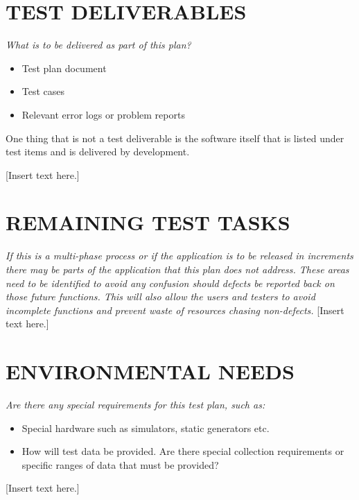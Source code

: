 \section[TEST DELIVERABLES]{\bfseries\color{black} TEST DELIVERABLES}
{\itshape\color{black}
What is to be delivered as part of this plan?

\begin{itemize}
\item Test plan document
\item Test cases
\item Relevant error logs or problem reports
\end{itemize}
One thing that is not a test deliverable is the software itself that
is listed under test items and is delivered by development.
}
{\color{black}
[Insert text here.]}

\section[REMAINING TEST TASKS]{\bfseries\color{black} REMAINING TEST TASKS}
{\itshape\color{black}
If this is a multi-phase process or if the application is to be
released in increments there may be parts of the application that this
plan does not address. These areas need to be identified to avoid any
confusion should defects be reported back on those future
functions. This will also allow the users and testers to avoid
incomplete functions and prevent waste of resources chasing non-defects.
}
{\color{black}
[Insert text here.]}

\section[ENVIRONMENTAL NEEDS]{\bfseries\color{black} ENVIRONMENTAL NEEDS}
{\itshape\color{black}
Are there any special requirements for this test plan, such as:

\begin{itemize}
\item Special hardware such as simulators, static generators etc.
\item How will test data be provided. Are there special collection
	requirements or specific ranges of data that must be provided? 
\end{itemize}

}
{\color{black}
[Insert text here.]}

